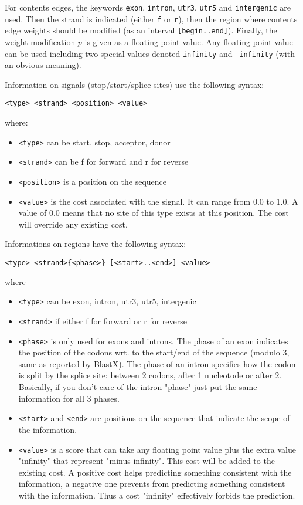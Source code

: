 For contents edges, the keywords \texttt{exon}, \texttt{intron},
\texttt{utr3}, \texttt{utr5} and \texttt{intergenic} are used. Then
the strand is indicated (either \texttt{f} or \texttt{r}), then the
region where contents edge weights should be modified (as an interval
\texttt{[begin..end]}). Finally, the weight modification $p$ is given
as a floating point value. Any floating point value can be used
including two special values denoted \texttt{infinity} and
\texttt{-infinity} (with an obvious meaning).

  Information on signals (stop/start/splice sites) use the
  following syntax:
  \begin{Verbatim}[fontsize=\small]
  <type> <strand> <position> <value>
\end{Verbatim}
  where:
  \begin{itemize}
  \item \verb|<type>| can be start, stop, acceptor, donor 
  \item \verb|<strand>| can be f for forward and r for reverse
  \item \verb|<position>| is a position on the sequence 
  \item \verb|<value>| is the cost associated with the signal. It can range
    from 0.0 to 1.0. A value of 0.0 means that no site of this type
    exists at this position.  The cost will override any existing
    cost.
  \end{itemize} 
  
Informations on regions have the following syntax:
  \begin{Verbatim}[fontsize=\small]
         <type> <strand>{<phase>} [<start>..<end>] <value>
\end{Verbatim}
where
\begin{itemize}
\item \verb|<type>| can be exon, intron, utr3, utr5, intergenic
\item \verb|<strand>| if either f for forward or r for reverse

\item \verb|<phase>| is only used for exons and introns. The phase of an
  exon indicates the position of the codons wrt. to the
  start/end of the sequence (modulo 3, same as reported by
  BlastX). The phase of an intron specifies how the codon is
  split by the splice site: between 2 codons, after 1
  nucleotode or after 2. Basically, if you don't care of the
  intron "phase" just put the same information for all 3
  phases.
  
\item \verb|<start>| and \verb|<end>| are positions on the sequence that
  indicate the scope of the information.
  
\item \verb|<value>| is a score that can take any floating point value
  plus the extra value "infinity" that represent "minus
  infinity". This cost will be added to the existing cost.  A
  positive cost helps predicting something consistent with the
  information, a negative one prevents from predicting
  something consistent with the information. Thus a cost
  "infinity" effectively forbids the prediction.
\end{itemize}

